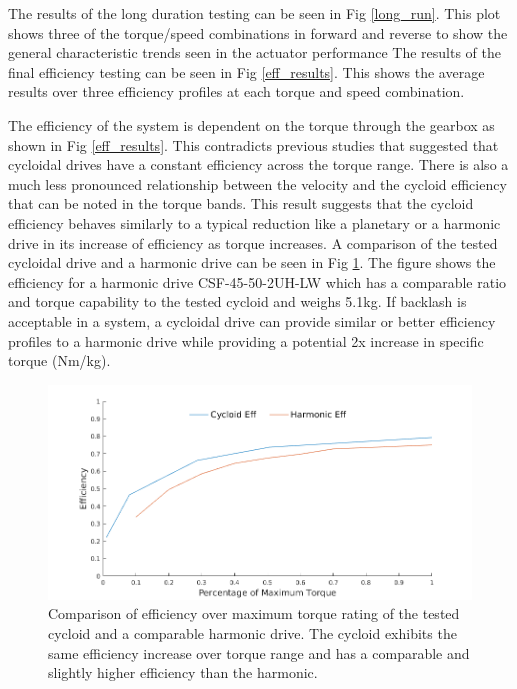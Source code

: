 
The results of the long duration testing can be seen in Fig \ref{long_run}. This plot shows three of the torque/speed combinations in forward and reverse to show the general characteristic trends seen in the actuator performance
The results of the final efficiency testing can be seen in Fig \ref{eff_results}. This shows the average results over three efficiency profiles at each torque and speed combination.

The efficiency of the system is dependent on the torque through the gearbox as shown in Fig \ref{eff_results}.
This contradicts previous studies that suggested that cycloidal drives have a constant efficiency across the torque range.
There is also a much less pronounced relationship between the velocity and the cycloid efficiency that can be noted in the torque bands.
This result suggests that the cycloid efficiency behaves similarly to a typical reduction like a planetary or a harmonic drive in its increase of efficiency as torque increases. 
A comparison of the tested cycloidal drive and a harmonic drive can be seen in Fig \ref{eff_comp}.
The figure shows the efficiency for a harmonic drive CSF-45-50-2UH-LW \cite{harmonic_sheet} which has a comparable ratio and torque capability to the tested cycloid and weighs 5.1kg.
If backlash is acceptable in a system, a cycloidal drive can provide similar or better efficiency profiles to a harmonic drive while providing a potential 2x increase in specific torque (Nm/kg).

\begin{figure}[t]
   \centering
   \includegraphics[width=\linewidth]{images/eff_comp_v3}
   \caption{Comparison of efficiency over maximum torque rating of the tested cycloid and a comparable harmonic drive.
   The cycloid exhibits the same efficiency increase over torque range and has a comparable and slightly higher efficiency than the harmonic. }
   \label{eff_comp}
\end{figure}

